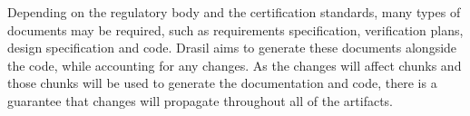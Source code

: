 \documentclass{sig-alternate-05-2015}
\newcommand{\lss}{Drasil}
\begin{document}
Depending on the regulatory body and the certification standards, many
types of documents may be required, such as requirements specification,
verification plans, design specification and code. \lss{} aims to generate these
documents alongside the code, while accounting for any changes. As the changes
will affect chunks and those chunks will be used to generate the documentation
and code, there is a guarantee that changes will propagate throughout all of the
artifacts.

\end{document}
